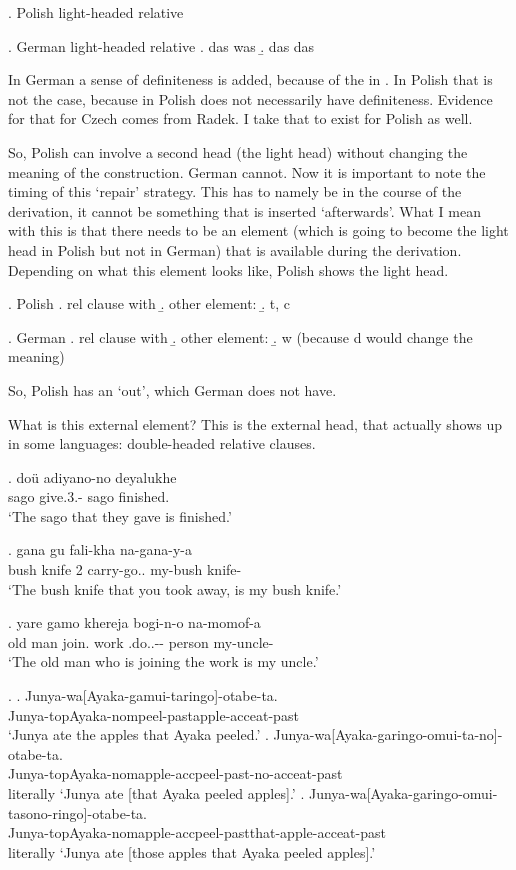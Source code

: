 \ex. Polish light-headed relative

\ex. German light-headed relative
\a. das was
\b. das das

In German a sense of definiteness is added, because of the  in . In Polish that is not the case, because  in Polish does not necessarily have definiteness. Evidence for that for Czech comes from Radek. I take that to exist for Polish as well.

So, Polish can involve a second head (the light head) without changing the meaning of the construction. German cannot. Now it is important to note the timing of this `repair' strategy. This has to namely be in the course of the derivation, it cannot be something that is inserted `afterwards'. What I mean with this is that there needs to be an element (which is going to become the light head in Polish but not in German) that is available during the derivation. Depending on what this element looks like, Polish shows the light head.

\ex. Polish
\a. rel clause with 
\b. other element: 
\b. t, c

\ex. German
\a. rel clause with 
\b. other element: 
\b. w (because d would change the meaning)

So, Polish has an `out', which German does not have.

What is this external element? This is the external head, that actually shows up in some languages: double-headed relative clauses.

\exg. doü adiyano-no  deyalukhe\\
 sago give.3.- sago finished.\\
 `The sago that they gave is finished.' 

\exg. gana gu fali-kha  na-gana-y-a\\
 {bush knife} 2 carry-go.. my-{bush knife}-\\
 `The bush knife that you took away, is my bush knife.'

\exg. yare gamo khereja bogi-n-o  na-momof-a\\
 {old man} join. work .do..-- person my-uncle-\\
 `The old man who is joining the work is my uncle.'


\ex.
\ag. Junya-wa[Ayaka-gamui-taringo]-otabe-ta.\\
 Junya-topAyaka-nompeel-pastapple-acceat-past\\
 ‘Junya ate the apples that Ayaka peeled.’
\bg. Junya-wa[Ayaka-garingo-omui-ta-no]-otabe-ta.\\
 Junya-topAyaka-nomapple-accpeel-past-no-acceat-past\\
 literally ‘Junya ate [that Ayaka peeled apples].’
\bg. Junya-wa[Ayaka-garingo-omui-tasono-ringo]-otabe-ta.\\
 Junya-topAyaka-nomapple-accpeel-pastthat-apple-acceat-past\\
 literally ‘Junya ate [those apples that Ayaka peeled apples].’


